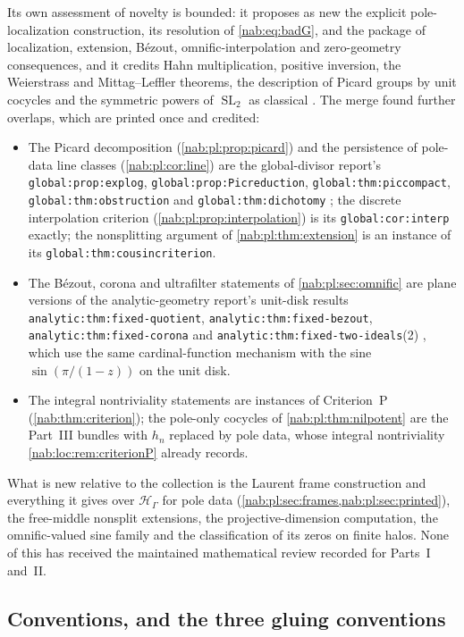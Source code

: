 \documentclass[11pt,letterpaper]{article}
\theoremstyle{definition}
\theoremstyle{remark}
\newcommand{\HH}{\mathscr H_\Gamma}
\newcommand{\SL}{\operatorname{SL}}
\numberwithin{equation}{section}
\begin{document}
Its own assessment of novelty is bounded: it proposes as new the explicit
pole-localization construction, its resolution of \eqref{nab:eq:badG}, and the
package of localization, extension, B\'ezout, omnific-interpolation and
zero-geometry consequences, and it credits Hahn multiplication, positive
inversion, the Weierstrass and Mittag--Leffler theorems, the description of
Picard groups by unit cocycles and the symmetric powers of $\SL_2$ as classical
\cite{Poonen,Greenfield,Rudin,ForstnericPrezelj}. The merge found further
overlaps, which are printed once and credited:
\begin{itemize}
\item The Picard decomposition (\cref{nab:pl:prop:picard}) and the persistence
of pole-data line classes (\cref{nab:pl:cor:line}) are the global-divisor
report's \nolinkurl{global:prop:explog}, \nolinkurl{global:prop:Picreduction},
\nolinkurl{global:thm:piccompact}, \nolinkurl{global:thm:obstruction} and
\nolinkurl{global:thm:dichotomy} \cite{RepoGlobal}; the discrete interpolation
criterion (\cref{nab:pl:prop:interpolation}) is its \nolinkurl{global:cor:interp}
exactly; the nonsplitting argument of \cref{nab:pl:thm:extension} is an
instance of its \nolinkurl{global:thm:cousincriterion}.
\item The B\'ezout, corona and ultrafilter statements of
\cref{nab:pl:sec:omnific} are plane versions of the analytic-geometry report's
unit-disk results \nolinkurl{analytic:thm:fixed-quotient},
\nolinkurl{analytic:thm:fixed-bezout}, \nolinkurl{analytic:thm:fixed-corona} and
\nolinkurl{analytic:thm:fixed-two-ideals}(2) \cite{RepoGeometry}, which use the
same cardinal-function mechanism with the sine $\sin(\pi/(1-z))$ on the unit
disk.
\item The integral nontriviality statements are instances of Criterion~P
(\cref{nab:thm:criterion}); the pole-only cocycles of
\cref{nab:pl:thm:nilpotent} are the Part~III bundles with $h_n$ replaced by
pole data, whose integral nontriviality \cref{nab:loc:rem:criterionP} already
records.
\end{itemize}
What is new relative to the collection is the Laurent frame construction and
everything it gives over $\HH$ for pole data
(\cref{nab:pl:sec:frames,nab:pl:sec:printed}), the free-middle nonsplit
extensions, the projective-dimension computation, the omnific-valued sine family
and the classification of its zeros on finite halos. None of this has received
the maintained mathematical review recorded for Parts~I and~II.

\subsection{Conventions, and the three gluing conventions}\label{nab:pl:sub:names}
\end{document}

